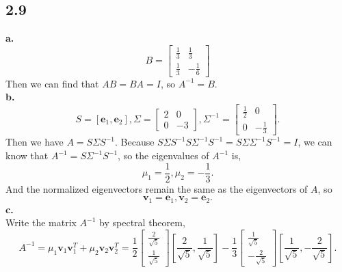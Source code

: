 \documentclass{article}
\begin{document}
\subsection*{2.9}
\textbf{a.}\\
\begin{equation*}
  B = \left[
    \begin{matrix}
      \frac{1}{3}&\frac{1}{3}\\
      \frac{1}{3}&-\frac{1}{6}
    \end{matrix}\right]
\end{equation*}
Then we can find that $AB = BA = I$, so $A^{-1} = B$.\\
\textbf{b.}\\
\begin{equation*}
  S = \left[\mathbf{e}_1, \mathbf{e}_2\right], \Sigma = \left[
    \begin{matrix}
      2&0\\
      0&-3
    \end{matrix}\right], \Sigma^{-1} = \left[
    \begin{matrix}
      \frac{1}{2}&0\\
      0&-\frac{1}{3}
    \end{matrix}\right].
\end{equation*}
Then we have $A = S\Sigma S^{-1}$.
Because $S\Sigma S^{-1} S\Sigma^{-1}S^{-1} = S\Sigma\Sigma^{-1}S^{-1} = I$,
we can know that $A^{-1} = S\Sigma^{-1}S^{-1}$, so the eigenvalues of $A^{-1}$ is,
\begin{equation*}
  \mu_1 = \frac{1}{2}, \mu_2 = -\frac{1}{3}.
\end{equation*}
And the normalized eigenvectors remain the same as the eigenvectors of $A$, so
\begin{equation*}
  \mathbf{v}_1 = \mathbf{e}_1, \mathbf{v}_2 = \mathbf{e}_2.
\end{equation*}
\textbf{c.}\\
Write the matrix $A^{-1}$ by spectral theorem,
\begin{equation*}
  A^{-1} = \mu_1\mathbf{v}_1\mathbf{v}_1^T + \mu_2\mathbf{v}_2\mathbf{v}_2^T = \frac{1}{2}\left[
    \begin{matrix}
      \frac{2}{\sqrt{5}}\\
      \frac{1}{\sqrt{5}}
    \end{matrix}\right]\left[\frac{2}{\sqrt{5}}, \frac{1}{\sqrt{5}}\right] - \frac{1}{3}\left[
    \begin{matrix}
      \frac{1}{\sqrt{5}}\\
      -\frac{2}{\sqrt{5}}
    \end{matrix}\right]\left[\frac{1}{\sqrt{5}}, - \frac{2}{\sqrt{5}}\right].
\end{equation*}
\end{document}
